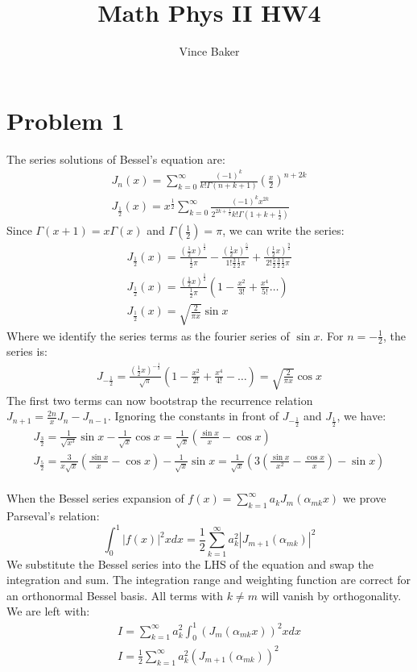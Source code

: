 \documentclass[a4paper,12pt]{article}
\title{Math Phys II HW4}
\author{Vince Baker}
\numberwithin{equation}{section}
\begin{document}
\maketitle

\section{Problem 1}
The series solutions of Bessel's equation are:
\begin{gather}
 J_n(x)=\sum_{k=0}^{\infty}\frac{(-1)^k}{k!\Gamma(n+k+1)}(\frac{x}{2})^{n+2k}\\
 J_{\frac{1}{2}}(x)=x^{\frac{1}{2}}\sum_{k=0}^{\infty}\frac{(-1)^kx^{2k}}{2^{2k+\frac{1}{2}}k!\Gamma(1+k+\frac{1}{2})}
\end{gather}
Since $\Gamma(x+1)=x\Gamma(x)$ and $\Gamma(\frac{1}{2})=\pi$, we can write the series:
\begin{gather}
 J_{\frac{1}{2}}(x)=\frac{(\frac{1}{2}x)^\frac{1}{2}}{\frac{1}{2}\pi}
 -\frac{(\frac{1}{2}x)^\frac{5}{2}}{1!\frac{3}{2}\frac{1}{2}\pi}
 +\frac{(\frac{1}{2}x)^\frac{9}{2}}{2!\frac{5}{2}\frac{3}{2}\frac{1}{2}\pi}\\
 J_{\frac{1}{2}}(x)=\frac{(\frac{1}{2}x)^\frac{1}{2}}{\frac{1}{2}\pi}(1-\frac{x^2}{3!}+\frac{x^4}{5!}\ldots)\\
 J_{\frac{1}{2}}(x)=\sqrt{\frac{2}{\pi x}}\sin x
\end{gather}
Where we identify the series terms as the fourier series of $\sin x$. For $n=-\frac{1}{2}$, the series is:
\begin{gather}
 J_{-\frac{1}{2}}=\frac{(\frac{1}{2}x)^{-\frac{1}{2}}}{\sqrt{\pi}}(1-\frac{x^2}{2!}+\frac{x^4}{4!}-\ldots)=\sqrt{\frac{2}{\pi x}}\cos x
\end{gather}
The first two terms can now bootstrap the recurrence relation $J_{n+1}=\frac{2n}{x}J_n-J_{n-1}$.
Ignoring the constants in front of $J_{-\frac{1}{2}}$ and $J_{\frac{1}{2}}$, we have:
\begin{gather}
 J_{\frac{3}{2}}=\frac{1}{\sqrt{x^3}}\sin x- \frac{1}{\sqrt{x}}\cos x=\frac{1}{\sqrt{x}}(\frac{\sin x}{x}-\cos x)\\
 J_{\frac{5}{2}}=\frac{3}{x\sqrt{x}}(\frac{\sin x}{x}-\cos x)-\frac{1}{\sqrt{x}}\sin x= \frac{1}{\sqrt{x}}(3(\frac{\sin x}{x^2}-\frac{\cos x}{x} )-\sin x)
\end{gather}
\\
When the Bessel series expansion of $f(x)=\sum_{k=1}^{\infty}a_kJ_m(\alpha_{mk}x)$ we prove Parseval's relation:
\begin{equation}
 \int_0^1|f(x)|^2xdx=\frac{1}{2}\sum_{k=1}^{\infty}a_k^2|J_{m+1}(\alpha_{mk})|^2
\end{equation}
We substitute the Bessel series into the LHS of the equation and swap the integration and sum. 
The integration range and weighting function are correct for an orthonormal Bessel basis.
All terms with $k\neq m$ will vanish by orthogonality. We are left with:
\begin{gather}
 I=\sum_{k=1}^{\infty}a_k^2\int_0^1(J_m(\alpha_{mk}x))^2xdx\\
 I=\frac{1}{2}\sum_{k=1}^{\infty}a_k^2(J_{m+1}(\alpha_{mk}))^2
\end{gather}
\end{document}
